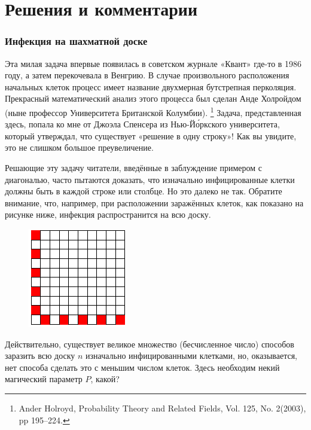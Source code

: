 ﻿\section*{Решения и комментарии}

\subsubsection*{Инфекция на шахматной доске}%

Эта милая задача впервые появилась в советском журнале «Квант» %
где-то в 1986 году, а затем перекочевала в Венгрию.
В случае произвольного расположения начальных клеток процесс имеет название двухмерная бутстрепная перколяция.
Прекрасный математический анализ этого процесса был сделан Анде Холройдом (ныне профессор Университета Британской Колумбии).%
\footnote{Ander Holroyd, Probability Theory and Related Fields, Vol. 125, No. 2(2003), pp 195--224.}
Задача, представленная здесь, попала ко мне от Джоэла Спенсера %
из Нью-Йо́ркского университета, который утверждал, что существует «решение в одну строку»!
Как вы увидите, это не слишком большое преувеличение.

Решающие эту задачу читатели, введённые в заблуждение примером с диагональю, часто пытаются доказать, что изначально инфицированные клетки должны быть в каждой строке или столбце.
Но это далеко не так.
Обратите внимание, что, например, при расположении заражённых клеток, как показано на рисунке ниже, инфекция распространится на всю доску.

\begin{figure}[h!]
\centering
\includegraphics[scale=1.5]{Figs/Algorithms/sick}
\end{figure}

\medskip

Действительно, существует великое множество (бесчисленное число) способов заразить всю доску $n$ изначально инфицированными клетками, но, оказывается, нет способа сделать это с меньшим числом клеток.
Здесь необходим некий магический параметр $P$, какой?

